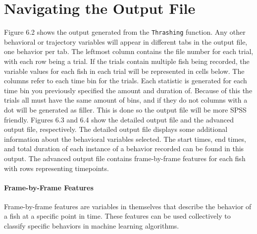 \documentclass[12pt,titlepage]{report}
\begin{document}
\pagebreak
\section{Navigating the Output File}
Figure 6.2 shows the output generated from the \texttt{Thrashing} function. Any other behavioral or trajectory variables will appear in different tabs in the output file, one behavior per tab. The leftmost column contains the file number for each trial, with each row being a trial. If the trials contain multiple fish being recorded, the variable values for each fish in each trial will be represented in cells below. The columns refer to each time bin for the trials. Each statistic is generated for each time bin you previously specified the amount and duration of. Because of this the trials all must have the same amount of bins, and if they do not columns with a dot will be generated as filler. This is done so the output file will be more SPSS friendly. Figures 6.3 and 6.4 show the detailed output file and the advanced output file, respectively. The detailed output file displays some additional information about the behavioral variables selected. The start times, end times, and total duration of each instance of a behavior recorded can be found in this output. The advanced output file contains frame-by-frame features for each fish with rows representing timepoints.
\paragraph{Frame-by-Frame Features}
Frame-by-frame features are  variables in themselves that describe the behavior of a fish at a specific point in time. These features can be used collectively to classify specific behaviors in machine learning algorithms. 
\end{document}

